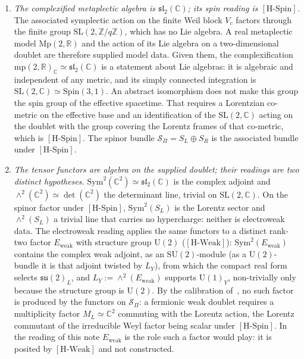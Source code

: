 \documentclass[11pt,a4paper]{article}
\theoremstyle{definition}
\newcommand{\SU}{\mathrm{SU}}
\newcommand{\su}{\mathfrak{su}}
\newcommand{\UU}{\mathrm{U}}
\newcommand{\Mp}{\mathrm{Mp}}
\newcommand{\Spin}{\mathrm{Spin}}
\newcommand{\SL}{\mathrm{SL}}
\newcommand{\Sbundle}{\mathcal{S}_\Pi}
\newcommand{\Ew}{E_{\mathrm{weak}}}
\newcommand{\HSpin}{\ensuremath{[\mathrm{H\text{-}Spin}]}}
\newcommand{\HWeak}{\ensuremath{[\mathrm{H\text{-}Weak}]}}
\begin{document}
    \begin{enumerate}
      \item \textit{The complexified metaplectic algebra is $\mathfrak{sl}_2(\mathbb{C})$; its spin reading is
      \HSpin{}.}
      The associated symplectic action on the finite Weil block $V_c$ factors through the finite group $\SL(2,\mathbb{Z}/q\mathbb{Z})$, which has no Lie algebra.
      A real metaplectic model $\Mp(2,\mathbb{R})$ and the action of its Lie algebra on a two-dimensional doublet
      are therefore supplied model data.
      Given them, the complexification $\mathrm{mp}(2,\mathbb{R})_\mathbb{C} \simeq \mathfrak{sl}_2(\mathbb{C})$ is a
      statement about Lie algebras: it is algebraic and independent of any metric, and its simply connected
      integration is $\SL(2,\mathbb{C}) \simeq \Spin(3,1)$.
      An abstract isomorphism does not make this group the spin group of the effective spacetime.
      That requires a Lorentzian co-metric on the effective base and an identification of the $\SL(2,\mathbb{C})$
      acting on the doublet with the group covering the Lorentz frames of that co-metric, which is \HSpin{}.
      The spinor bundle $\Sbundle = S_L \oplus S_R$ is the associated bundle under \HSpin{}.

      \item \textit{The tensor functors are algebra on the supplied doublet; their readings are two distinct
      hypotheses.}
      $\mathrm{Sym}^2(\mathbb{C}^2) \simeq \mathfrak{sl}_2(\mathbb{C})$ is the complex adjoint and
      $\wedge^2(\mathbb{C}^2) \simeq \det(\mathbb{C}^2)$ the determinant line, trivial on $\SL(2,\mathbb{C})$.
      On the spinor factor under \HSpin{}, $\mathrm{Sym}^2(S_L)$ is the Lorentz sector and $\wedge^2(S_L)$ a trivial
      line that carries no hypercharge: neither is electroweak data.
      The electroweak reading applies the same functors to a distinct rank-two factor $\Ew$ with structure group
      $\UU(2)$ (\HWeak{}): $\mathrm{Sym}^2(\Ew)$ contains the complex weak adjoint, as an $\SU(2)$-module (as a
      $\UU(2)$-bundle it is that adjoint twisted by $L_Y$), from which the compact real form selects $\su(2)_L$, and
      $L_Y := \wedge^2(\Ew)$ supports $\UU(1)_Y$, non-trivially only because the structure
      group is $\UU(2)$.
      By the calibration of~\cite{Beau2026nsr}, no such factor is produced by the functors on $\Sbundle$: a fermionic
      weak doublet requires a multiplicity factor $M_L \simeq \mathbb{C}^2$ commuting with the Lorentz action,
      the Lorentz commutant of the irreducible Weyl factor being scalar under \HSpin{}.
      In the reading of this note $\Ew$ is the role such a factor would play: it is posited by \HWeak{} and not
      constructed.


\end{enumerate}
\end{document}
